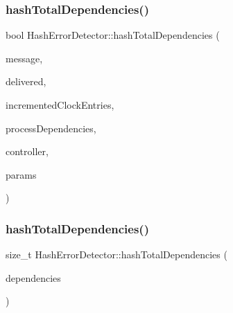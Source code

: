 \subsubsection{\texorpdfstring{hash\+Total\+Dependencies()}{hashTotalDependencies()}\hspace{0.1cm}{\footnotesize\ttfamily [1/2]}}
{\footnotesize\ttfamily bool Hash\+Error\+Detector\+::hash\+Total\+Dependencies (\begin{DoxyParamCaption}\item[{const \hyperlink{structures_8h_a7e7bdc1d2fff8a9436f2f352b2711ed6}{message\+Info} \&}]{message,  }\item[{const vector$<$ \hyperlink{structures_8h_a7e7bdc1d2fff8a9436f2f352b2711ed6}{message\+Info} $>$ \&}]{delivered,  }\item[{const vector$<$ unsigned int $>$ \&}]{incremented\+Clock\+Entries,  }\item[{const \hyperlink{class_total_dependencies}{Total\+Dependencies} \&}]{process\+Dependencies,  }\item[{\hyperlink{class_controller}{Controller} $\ast$}]{controller,  }\item[{\hyperlink{class_simulation_parameters}{Simulation\+Parameters} $\ast$}]{params }\end{DoxyParamCaption})}

\mbox{\label{class_hash_error_detector_afcad668b4f0ca1c838b40a3c0584c1ee}} 
\subsubsection{\texorpdfstring{hash\+Total\+Dependencies()}{hashTotalDependencies()}\hspace{0.1cm}{\footnotesize\ttfamily [2/2]}}
{\footnotesize\ttfamily size\+\_\+t Hash\+Error\+Detector\+::hash\+Total\+Dependencies (\begin{DoxyParamCaption}\item[{const \hyperlink{class_total_dependencies}{Total\+Dependencies} \&}]{dependencies }\end{DoxyParamCaption})}

\mbox{\label{class_hash_error_detector_a08b4518822a6beff6845da4dd36bfba1}} 
